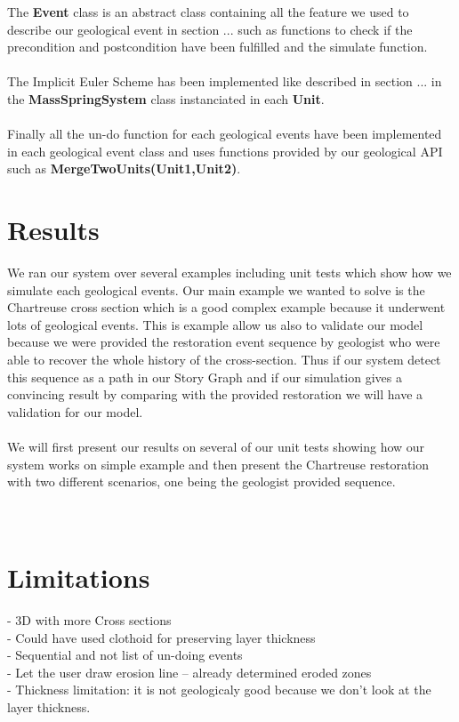 \documentclass[12pt, a4paper]{memoir} %
\begin{document}
The \textbf{Event} class is an abstract class containing all the feature we used to describe our geological event in section ... such as functions to check if the precondition and postcondition have been fulfilled and the simulate function.\\\\
The Implicit Euler Scheme has been implemented like described in section ... in the \textbf{MassSpringSystem} class instanciated in each \textbf{Unit}.\\\\
Finally all the un-do function for each geological events have been implemented in each geological event class and uses functions provided by our geological API such as \textbf{MergeTwoUnits(Unit1,Unit2)}. 

\chapter{Results}
We ran our system over several examples including unit tests which show how we simulate each geological events.
Our main example we wanted to solve is the Chartreuse cross section which is a good complex example because it underwent lots of geological events. This is example allow us also to validate our model because we were provided the restoration event sequence by geologist who were able to recover the whole history of the cross-section. Thus if our system detect this sequence as a path in our Story Graph and if our simulation gives a convincing result by comparing with the provided restoration we will have a validation for our model.\\\\
We will first present our results on several of our unit tests showing how our system works on simple example and then present the Chartreuse restoration with two different scenarios, one being the geologist provided sequence.\\\\\

\chapter{Limitations}

- 3D with more Cross sections\\
- Could have used clothoid for preserving layer thickness\\
- Sequential and not list of un-doing events\\
- Let the user draw erosion line -- already determined eroded zones\\
- Thickness limitation: it is not geologicaly good because we don't look at the layer thickness.
\end{document}
